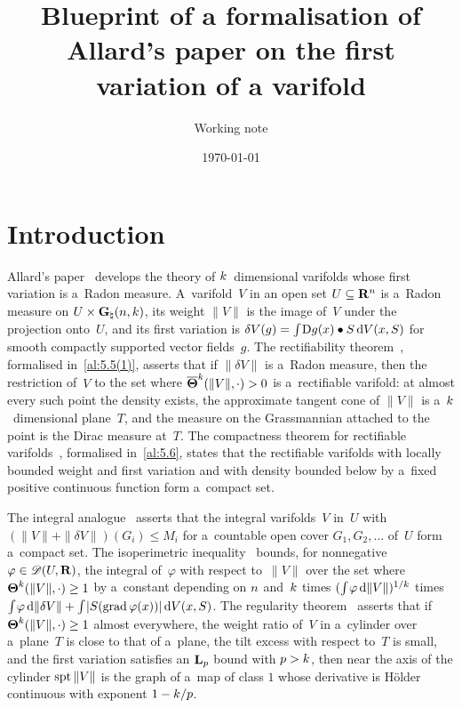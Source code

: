 \documentclass[a4paper,twoside,leqno]{article}
\date{\today}
\title{Blueprint of a formalisation of Allard's paper on the first variation of a varifold}
\author{Working note}
\begin{document}
\maketitle

\tableofcontents

\section{Introduction}
\label{sec:intro}

Allard's paper~\cite{Allard1972} develops the theory of $k$~dimensional varifolds whose first
variation is a~Radon measure. A~varifold~$V$ in an open set $U \subseteq \mathbf{R}^{n}$ is a~Radon
measure on $U \times \mathbf{G}_{\natural}(n,k)$, its weight $\|V\|$ is the image of~$V$ under the
projection onto~$U$, and its first variation is $\delta V(g) = {\textstyle\int_{}^{}} \mathrm{D} g(x) \bullet S \,\mathrm{d}
V(x,S)$ for smooth compactly supported vector fields~$g$. The rectifiability
theorem~\cite[5.5(1)]{Allard1972}, formalised in~\ref{al:5.5(1)}, asserts that if $\|\delta V\|$
is a~Radon measure, then the restriction of~$V$ to the set where $\boldsymbol{\overline{\Theta}}^{k}(\|V\|,\cdot) >
0$ is a~rectifiable varifold: at almost every such point the density exists, the approximate
tangent cone of $\|V\|$ is a~$k$~dimensional plane~$T$, and the measure on the Grassmannian
attached to the point is the Dirac measure at~$T$. The compactness theorem for rectifiable
varifolds~\cite[5.6]{Allard1972}, formalised in~\ref{al:5.6}, states that the rectifiable varifolds
with locally bounded weight and first variation and with density bounded below by a~fixed positive
continuous function form a~compact set.

The integral analogue~\cite[6.4]{Allard1972} asserts that the integral varifolds~$V$ in~$U$ with
$(\|V\| + \|\delta V\|)(G_i) \le M_i$ for a~countable open cover $G_1, G_2, \ldots$ of~$U$ form
a~compact set. The isoperimetric inequality~\cite[7.1]{Allard1972} bounds, for nonnegative
$\varphi \in \mathscr{D}(U,\mathbf{R})$, the integral of~$\varphi$ with respect to~$\|V\|$ over the set where
$\boldsymbol{\Theta}^{k}(\|V\|,\cdot) \ge 1$ by a~constant depending on $n$ and~$k$ times
$({\textstyle\int_{}^{}} \varphi \,\mathrm{d} \|V\|)^{1/k}$ times ${\textstyle\int_{}^{}} \varphi \,\mathrm{d} \|\delta V\| +
{\textstyle\int_{}^{}} |S(\operatorname{grad} \varphi(x))| \,\mathrm{d} V(x,S)$. The regularity theorem~\cite[8.19]{Allard1972}
asserts that if $\boldsymbol{\Theta}^{k}(\|V\|,\cdot) \ge 1$ almost everywhere, the weight ratio of~$V$
in a~cylinder over a~plane~$T$ is close to that of a~plane, the tilt excess with respect to~$T$ is
small, and the first variation satisfies an $\mathbf{L}_{p}$ bound with $p > k$, then near the axis
of the cylinder $\operatorname{spt} \|V\|$ is the graph of a~map of class $1$ whose derivative is H\"older
continuous with exponent $1 - k/p$.
\end{document}
